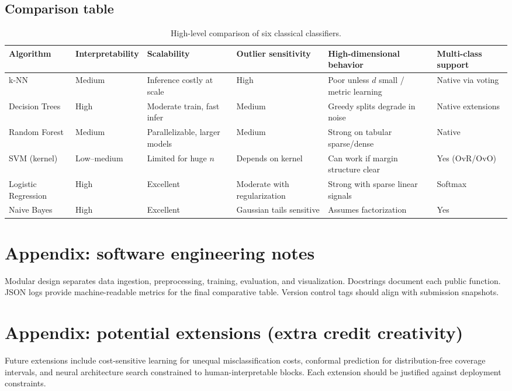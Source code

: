 \documentclass[11pt,a4paper]{article}
\begin{document}
\subsection{Comparison table}
\begin{table}[htbp]
\centering
\caption{High-level comparison of six classical classifiers.}
\label{tab:classical-compare}
\begin{tabularx}{\textwidth}{@{}lXXXXX@{}}
\toprule
Algorithm & Interpretability & Scalability & Outlier sensitivity & High-dimensional behavior & Multi-class support \\
\midrule
k-NN & Medium & Inference costly at scale & High & Poor unless $d$ small / metric learning & Native via voting \\ \addlinespace
Decision Trees & High & Moderate train, fast infer & Medium & Greedy splits degrade in noise & Native extensions \\ \addlinespace
Random Forest & Medium & Parallelizable, larger models & Medium & Strong on tabular sparse/dense & Native \\ \addlinespace
SVM (kernel) & Low--medium & Limited for huge $n$ & Depends on kernel & Can work if margin structure clear & Yes (OvR/OvO) \\ \addlinespace
Logistic Regression & High & Excellent & Moderate with regularization & Strong with sparse linear signals & Softmax \\ \addlinespace
Naive Bayes & High & Excellent & Gaussian tails sensitive & Assumes factorization & Yes \\
\bottomrule
\end{tabularx}
\end{table}

\section{Appendix: software engineering notes}
Modular design separates data ingestion, preprocessing, training, evaluation, and visualization. Docstrings document each public function. JSON logs provide machine-readable metrics for the final comparative table. Version control tags should align with submission snapshots.

\section{Appendix: potential extensions (extra credit creativity)}
Future extensions include cost-sensitive learning for unequal misclassification costs, conformal prediction for distribution-free coverage intervals, and neural architecture search constrained to human-interpretable blocks. Each extension should be justified against deployment constraints.
\end{document}

